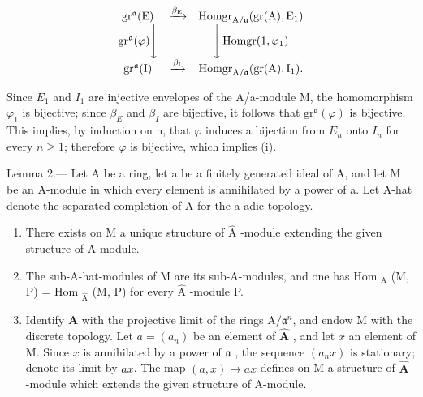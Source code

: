 \[
\begin{array}{c c c} \operatorname{gr} ^ {\mathfrak {a}} (\mathrm{E}) & \xrightarrow {\beta_ {\mathrm{E}}} & \operatorname{Homgr} _ {\mathrm{A} / \mathfrak {a}} (\operatorname{gr} (\mathrm{A}), \mathrm{E} _ {1}) \\ \operatorname{gr} ^ {\mathfrak {a}} (\varphi) \Bigg \downarrow & & \Bigg \downarrow \operatorname{Homgr} (1, \varphi_ {1}) \\ \operatorname{gr} ^ {\mathfrak {a}} (\mathrm{I}) & \xrightarrow {\beta_ {\mathrm{I}}} & \operatorname{Homgr} _ {\mathrm{A} / \mathfrak {a}} (\operatorname{gr} (\mathrm{A}), \mathrm{I} _ {1}). \end{array}
\]

Since \(E_{1}\) and \(I_{1}\) are injective envelopes of the A/a-module M, the homomorphism \(\varphi_{1}\) is bijective; since \(\beta_{E}\) and \(\beta_{I}\) are bijective, it follows that \(\mathrm{gr}^{\mathfrak{a}}(\varphi)\) is bijective. This implies, by induction on n, that \(\varphi\) induces a bijection from \(E_{n}\) onto \(I_{n}\) for every \(n \geqslant 1\); therefore \(\varphi\) is bijective, which implies (i).

Lemma 2.--- Let A be a ring, let a be a finitely generated ideal of A, and let M be an A-module in which every element is annihilated by a power of a. Let A-hat denote the separated completion of A for the a-adic topology.

\begin{enumerate}
\def\labelenumi{\alph{enumi})}
\item
  There exists on M a unique structure of \(\widehat{\mathrm{A}}\) -module extending the given structure of A-module.
\item
  The sub-A-hat-modules of M are its sub-A-modules, and one has Hom \(_{\text{A}}\) (M, P) = Hom \(_{\widehat{\text{A}}}\) (M, P) for every \(\widehat{\text{A}}\) -module P.
\item
  Identify \(\widehat{\mathbf{A}}\) with the projective limit of the rings \(\mathrm{A} / \mathfrak{a}^n\), and endow M with the discrete topology. Let \(a = (a_n)\) be an element of \(\widehat{\mathbf{A}}\) , and let \(x\) an element of M. Since \(x\) is annihilated by a power of \(\mathfrak{a}\) , the sequence \((a_n x)\) is stationary; denote its limit by \(ax\). The map \((a, x) \mapsto ax\) defines on M a structure of \(\widehat{\mathbf{A}}\) -module which extends the given structure of A-module.
\end{enumerate}

